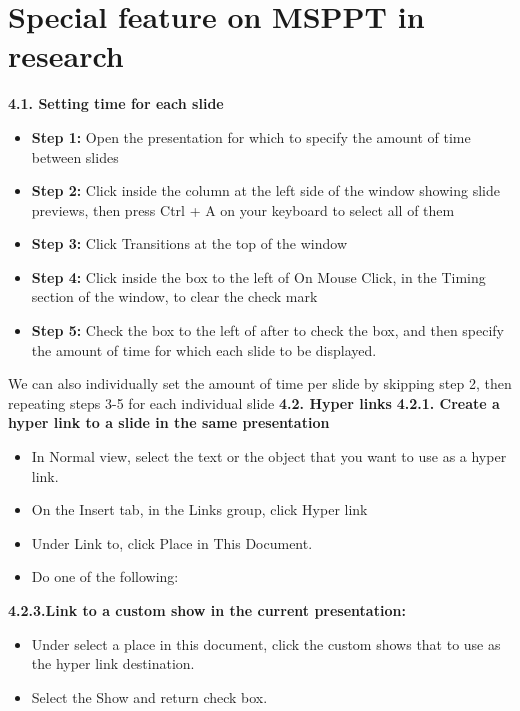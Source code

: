 \chapter{\textbf{Special feature on MSPPT in research}}


\textbf{4.1. Setting time for each slide}
\begin{itemize} 
  \item \textbf{Step 1:} Open the presentation for which to specify the amount of time between slides
  \item \textbf{Step 2:} Click inside the column at the left side of the window showing slide previews, then press Ctrl + A on your keyboard to select all of them
  \item \textbf{Step 3:} Click Transitions at the top of the window
  \item \textbf{Step 4:} Click inside the box to the left of On Mouse Click, in the Timing section of the window, to clear the check mark
  \item \textbf{Step 5:} Check the box to the left of after to check the box, and then specify the amount of time for which each slide to be displayed.
\end{itemize}


We can also individually set the amount of time per slide by skipping step 2, then repeating steps 3-5 for each individual slide
\textbf{4.2. Hyper links}\cite {Codeman Lisa}
\textbf{4.2.1. Create a hyper link to a slide in the same presentation}
\begin{itemize}
  \item In Normal view, select the text or the object that you want to use as a hyper link.
  \item On the Insert tab, in the Links group, click Hyper link
  \item Under Link to, click Place in This Document.
  \item Do one of the following:
\end{itemize}
	
\textbf{4.2.3.Link to a custom show in the current presentation:}
\begin{itemize}
  \item Under select a place in this document, click the custom shows that to use as the hyper link destination.
  \item Select the Show and return check box.
\end{itemize}

